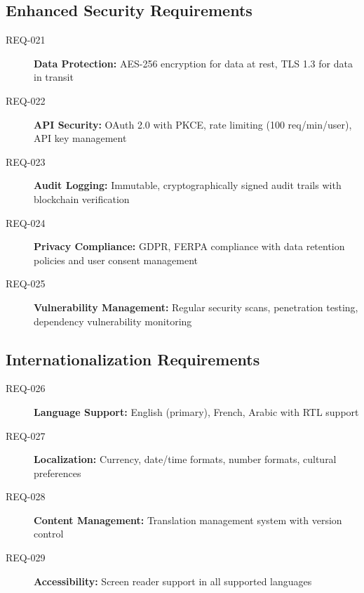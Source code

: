 \documentclass[11pt, a4paper]{article}
\begin{document}
\subsection{Enhanced Security Requirements}
\label{sec:enhanced_security}

\begin{requirementbox}[title=Comprehensive Security Framework]
\begin{description}
    \item[REQ-021] \textbf{Data Protection:} AES-256 encryption for data at rest, TLS 1.3 for data in transit
    \item[REQ-022] \textbf{API Security:} OAuth 2.0 with PKCE, rate limiting (100 req/min/user), API key management
    \item[REQ-023] \textbf{Audit Logging:} Immutable, cryptographically signed audit trails with blockchain verification
    \item[REQ-024] \textbf{Privacy Compliance:} GDPR, FERPA compliance with data retention policies and user consent management
    \item[REQ-025] \textbf{Vulnerability Management:} Regular security scans, penetration testing, dependency vulnerability monitoring
\end{description}
\end{requirementbox}

\subsection{Internationalization Requirements}
\label{sec:i18n_enhanced}

\begin{requirementbox}[title=Multi-Language Support]
\begin{description}
    \item[REQ-026] \textbf{Language Support:} English (primary), French, Arabic with RTL support
    \item[REQ-027] \textbf{Localization:} Currency, date/time formats, number formats, cultural preferences
    \item[REQ-028] \textbf{Content Management:} Translation management system with version control
    \item[REQ-029] \textbf{Accessibility:} Screen reader support in all supported languages
\end{description}
\end{requirementbox}

\end{document}
